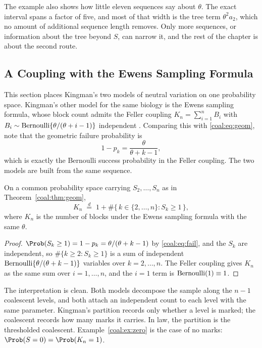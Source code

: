 The example also shows how little eleven sequences say about $\theta$. The exact interval spans a factor of five, and most of that width is the tree term $\theta^2a_2$, which no amount of additional sequence length removes. Only more sequences, or information about the tree beyond $S$, can narrow it, and the rest of the chapter is about the second route.

\subsection{A Coupling with the Ewens Sampling Formula}\label{coal:sec:ewens}

This section places Kingman's two models of neutral variation on one probability space. Kingman's other model for the same biology is the Ewens sampling formula, whose block count admits the Feller coupling $K_n=\sum_{i=1}^n B_i$ with $B_i\sim\mathrm{Bernoulli}\{\theta/(\theta+i-1)\}$ independent \citep{coal:ewens1972,coal:kingman1977}. Comparing this with \eqref{coal:eq:geom}, note that the geometric failure probability is
\begin{equation}\label{coal:eq:fail}
1-p_k=\frac{\theta}{\theta+k-1},
\end{equation}
which is exactly the Bernoulli success probability in the Feller coupling. The two models are built from the same sequence.

\begin{corollary}\label{coal:cor:duality}
On a common probability space carrying $S_2,\dots,S_n$ as in Theorem~\ref{coal:thm:geom},
\begin{equation}\label{coal:eq:duality}
K_n \;\overset{d}{=}\; 1+\#\{\,k\in\{2,\dots,n\}: S_k\ge 1\,\},
\end{equation}
where $K_n$ is the number of blocks under the Ewens sampling formula with the same $\theta$.
\end{corollary}

\begin{proof}
$\Prob(S_k\ge1)=1-p_k=\theta/(\theta+k-1)$ by \eqref{coal:eq:fail}, and the $S_k$ are independent, so $\#\{k\ge2: S_k\ge1\}$ is a sum of independent $\mathrm{Bernoulli}\{\theta/(\theta+k-1)\}$ variables over $k=2,\dots,n$. The Feller coupling gives $K_n$ as the same sum over $i=1,\dots,n$, and the $i=1$ term is $\mathrm{Bernoulli}(1)\equiv1$.
\end{proof}

The interpretation is clean. Both models decompose the sample along the $n-1$ coalescent levels, and both attach an independent count to each level with the same parameter. Kingman's partition records only whether a level is marked; the coalescent records how many marks it carries. In law, the partition is the thresholded coalescent. Example~\ref{coal:ex:zero} is the case of no marks: $\Prob(S=0)=\Prob(K_n=1)$.

